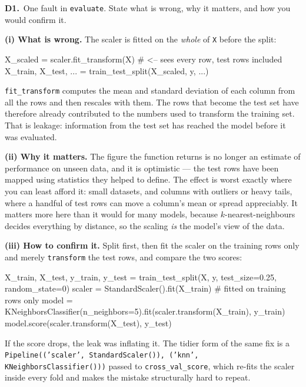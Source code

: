 \documentclass[10pt,a4paper]{article}
\begin{document}
\textbf{D1.}\ One fault in \texttt{evaluate}. State what is wrong, why it matters, and how you would
confirm it.

\vspace{2pt}

\textbf{(i) What is wrong.} The scaler is fitted on the \emph{whole} of \texttt{X} before the split:

\begin{code}
X_scaled = scaler.fit_transform(X)          # <-- sees every row, test rows included
X_train, X_test, ... = train_test_split(X_scaled, y, ...)
\end{code}

\texttt{fit\_transform} computes the mean and standard deviation of each column from all the rows and
then rescales with them. The rows that become the test set have therefore already contributed to the
numbers used to transform the training set. That is leakage: information from the test set has reached
the model before it was evaluated.

\textbf{(ii) Why it matters.} The figure the function returns is no longer an estimate of performance
on unseen data, and it is optimistic --- the test rows have been mapped using statistics they helped
to define. The effect is worst exactly where you can least afford it: small datasets, and columns with
outliers or heavy tails, where a handful of test rows can move a column's mean or spread appreciably.
It matters more here than it would for many models, because $k$-nearest-neighbours decides everything
by distance, so the scaling \emph{is} the model's view of the data.

\textbf{(iii) How to confirm it.} Split first, then fit the scaler on the training rows only and merely
\texttt{transform} the test rows, and compare the two scores:

\begin{code}
X_train, X_test, y_train, y_test = train_test_split(X, y, test_size=0.25, random_state=0)
scaler = StandardScaler().fit(X_train)      # fitted on training rows only
model  = KNeighborsClassifier(n_neighbors=5).fit(scaler.transform(X_train), y_train)
model.score(scaler.transform(X_test), y_test)
\end{code}

If the score drops, the leak was inflating it. The tidier form of the same fix is a
\texttt{Pipeline(\lbrack('scaler', StandardScaler()), ('knn', KNeighborsClassifier())\rbrack)} passed to
\texttt{cross\_val\_score}, which re-fits the scaler inside every fold and makes the mistake
structurally hard to repeat.
\end{document}
